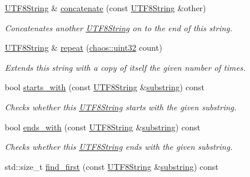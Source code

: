 \begin{DoxyCompactItemize}
\hyperlink{classchaos_1_1uni_1_1_u_t_f8_string}{U\-T\-F8\-String} \& \hyperlink{classchaos_1_1uni_1_1_u_t_f8_string_a7d8ef533d14720da24ea4926daa2bc3f}{concatenate} (const \hyperlink{classchaos_1_1uni_1_1_u_t_f8_string}{U\-T\-F8\-String} \&other)
\begin{DoxyCompactList}\small\item\em Concatenates another \hyperlink{classchaos_1_1uni_1_1_u_t_f8_string}{U\-T\-F8\-String} on to the end of this string. \end{DoxyCompactList}\item 
\hyperlink{classchaos_1_1uni_1_1_u_t_f8_string}{U\-T\-F8\-String} \& \hyperlink{classchaos_1_1uni_1_1_u_t_f8_string_aae17e9b7d3522e4b504d7d0b5ec22b6e}{repeat} (\hyperlink{namespacechaos_a8641b3ae4551f0b35570d4f9f4ec22d9}{chaos\-::uint32} count)
\begin{DoxyCompactList}\small\item\em Extends this string with a copy of itself the given number of times. \end{DoxyCompactList}\item 
bool \hyperlink{classchaos_1_1uni_1_1_u_t_f8_string_aa4c4a2af7ab4fd921b47a3cb6942ce32}{starts\-\_\-with} (const \hyperlink{classchaos_1_1uni_1_1_u_t_f8_string}{U\-T\-F8\-String} \&\hyperlink{classchaos_1_1uni_1_1_u_t_f8_string_a6a92e0b096b7d0087e3c784fa7f891aa}{substring}) const 
\begin{DoxyCompactList}\small\item\em Checks whether this \hyperlink{classchaos_1_1uni_1_1_u_t_f8_string}{U\-T\-F8\-String} starts with the given substring. \end{DoxyCompactList}\item 
bool \hyperlink{classchaos_1_1uni_1_1_u_t_f8_string_abdf7eeafa6a476ea484d7a2a0e5060e5}{ends\-\_\-with} (const \hyperlink{classchaos_1_1uni_1_1_u_t_f8_string}{U\-T\-F8\-String} \&\hyperlink{classchaos_1_1uni_1_1_u_t_f8_string_a6a92e0b096b7d0087e3c784fa7f891aa}{substring}) const 
\begin{DoxyCompactList}\small\item\em Checks whether this \hyperlink{classchaos_1_1uni_1_1_u_t_f8_string}{U\-T\-F8\-String} ends with the given substring. \end{DoxyCompactList}\item 
std\-::size\-\_\-t \hyperlink{classchaos_1_1uni_1_1_u_t_f8_string_a45f75e01bd07e664369c81758a0f0537}{find\-\_\-first} (const \hyperlink{classchaos_1_1uni_1_1_u_t_f8_string}{U\-T\-F8\-String} \&\hyperlink{classchaos_1_1uni_1_1_u_t_f8_string_a6a92e0b096b7d0087e3c784fa7f891aa}{substring}) const 

\end{DoxyCompactItemize}
